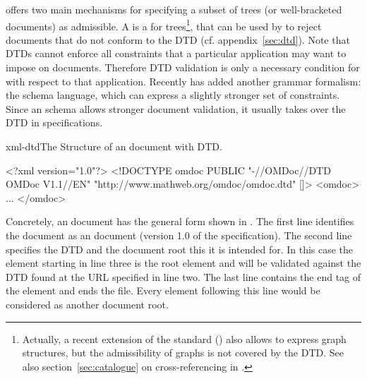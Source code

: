 {\xml} offers two main mechanisms for specifying a subset of trees (or
well-bracketed {\xml} documents) as admissible.  A {} {} is a {} for trees\footnote{Actually, a recent
  extension of the {\xml} standard ({\xlink}) also allows to express graph
  structures, but the admissibility of graphs is not covered by the DTD. See also
  section~\ref{sec:catalogue} on cross-referencing in {\omdoc}.}, that can be used
by {} to reject {\xml} documents that do not
conform to the {\omdoc} DTD (cf.  appendix~\ref{sec:dtd}).  Note that DTDs cannot
enforce all constraints that a particular {\xml} application may want to impose on
documents. Therefore DTD validation is only a necessary condition for
{} with respect to that application.  Recently {\xml} has added
another grammar formalism: the {\xml} schema language, which can express a slightly stronger set
of constraints. Since an {\xml} schema allows stronger document validation, it
usually takes {} over the
DTD in specifications.

\begin{myfig}{xml-dtd}{The Structure of an {\xml} document with DTD.}\footnotesize
\begin{boxedverbatim}
<?xml version="1.0"?> 
<!DOCTYPE omdoc PUBLIC "-//OMDoc//DTD OMDoc V1.1//EN" 
                       "http://www.mathweb.org/omdoc/omdoc.dtd" []> 
<omdoc>
 ...  
</omdoc>
\end{boxedverbatim}
\end{myfig}
Concretely, an {\omdoc} document has the general form shown in
{}. The first line identifies the document as an {\xml} document
(version 1.0 of the {\xml} specification). The second line specifies the DTD and
the document root {\omdoc} this it is intended for. In this case the
{} element starting in line three is the root element and will be
validated against the DTD found at the URL specified in line two. The last line
contains the end tag of the {} element and ends the file. Every
{\xml} element following this line would be considered as another document root.

